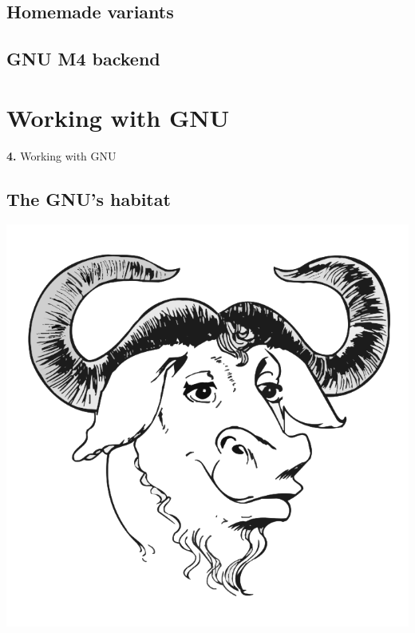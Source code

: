 \documentclass{beamer}
\begin{document}
\begin{frame}
  \frametitle{}
\end{frame}

\subsection{Homemade variants}
\subsection{GNU M4 backend}

\begin{frame}
\end{frame}

\section{Working with GNU}

\begingroup
{}
\begin{frame}
    \begin{center}
        \vspace{1cm}
        {\Huge\color{black} \textbf{4.} { Working with GNU}}
    \end{center}
\end{frame}
\endgroup

\subsection{The GNU's habitat}

\begin{frame}
  \begin{center}
    \includegraphics[scale=0.3]{gnu}
  \end{center}
\end{frame}
\end{document}
